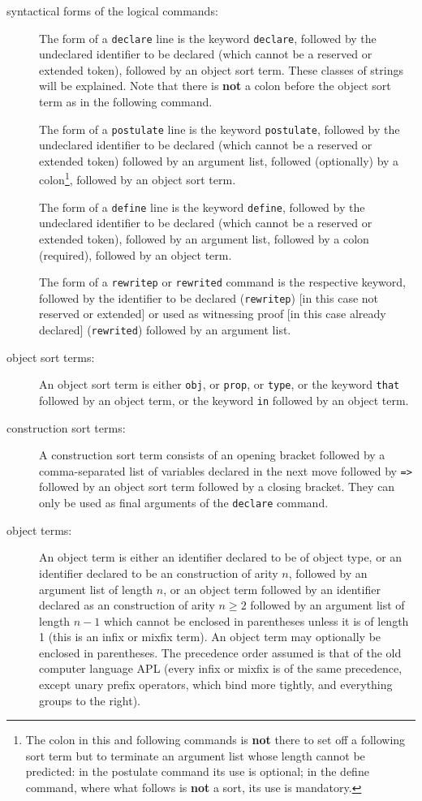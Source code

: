 \documentclass[12pt]{article}
\begin{document}
\begin{description}
\item[syntactical forms of the logical commands:]  The form of a {\tt declare} line is the keyword {\tt declare}, followed by the undeclared identifier to be declared (which cannot be a reserved or extended token), 
followed by an object sort term.   These classes of strings will be explained.  Note that there is {\bf not} a colon before the object sort term as in the following command.

The form of a {\tt postulate} line is the keyword {\tt postulate}, followed by the undeclared identifier to be declared (which cannot be a reserved or extended token) followed by an argument list,
followed (optionally) by a colon\footnote{The colon in this and following commands is {\bf not} there to set off a following sort term but to terminate an argument list whose length cannot be predicted:  in the postulate command its use is optional;  in the define command, where what follows is {\bf not} a sort, its use is mandatory.}, followed by an object sort term.

The form of a {\tt define} line is the keyword {\tt define}, followed by the undeclared identifier to be declared (which cannot be a reserved or extended token), followed by an argument list,
followed by a colon (required), followed by an object term.

The form of a {\tt rewritep} or {\tt rewrited} command is the respective keyword, followed by the identifier to be declared ({\tt rewritep}) [in this case not reserved or extended]  or used as witnessing proof [in this case already declared] ({\tt rewrited})
followed by an argument list.

\item[object sort terms:]  An object sort term is either {\tt obj}, or {\tt prop}, or {\tt type}, or the keyword {\tt that} followed by an object term, or the keyword {\tt in} followed by an object term.

\item[construction sort terms:]  A  construction sort term consists of an opening bracket followed by a comma-separated list of variables declared in the next move followed by {\tt =>} followed by an object sort term followed by a closing bracket.  They can only be used as final arguments of the {\tt declare} command.

\item[object terms:]  An object term is either an identifier declared to be of object type, or an identifier declared to be an construction of arity $n$, followed by an argument list of length $n$,
or an object term followed by an identifier declared as an construction of arity $n \geq 2$  followed by an argument list of length $n-1$ which cannot be enclosed in parentheses unless it is of length 1
(this is an infix or mixfix term).  An object term may optionally be enclosed in parentheses.  The precedence order assumed is that of the old computer language APL (every infix or mixfix is of the same precedence, except unary prefix operators, which bind more tightly, and everything groups to the right).


\end{description}
\end{document}

